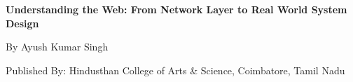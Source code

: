\begin{titlepage}
    \centering
    \vspace*{3cm}

    {\Huge\bfseries Understanding the Web: From Network Layer to Real World System Design \par}
    \vspace{1cm}
    {\Large By Ayush Kumar Singh\par}
    \vfill

    \vspace{1cm}

    {\large Published By: Hindusthan College of Arts \& Science, Coimbatore, Tamil Nadu}
\end{titlepage}
